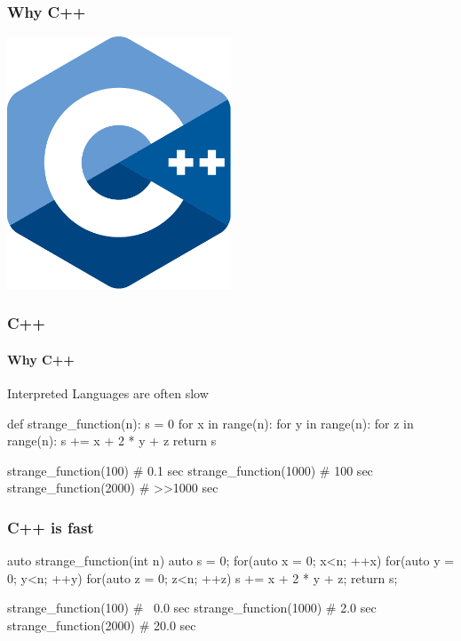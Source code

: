\documentclass{beamer}
\begin{document}
\begin{frame}[fragile]
\frametitle{Why C++}

\begin{center}
    \includegraphics[width=0.5\textwidth]{cpp.pdf}
\end{center}

\end{frame}

\begin{frame}[fragile]
\frametitle{C++}
\framesubtitle{Why C++}
Interpreted Languages are often slow
\begin{pythoncode}
def strange_function(n):
    s = 0
    for x in range(n):
        for y in range(n):
            for z in range(n):
                s += x + 2 * y + z
    return s
\end{pythoncode}
\vspace{-0.5cm}
\begin{pythoncode}
strange_function(100)   #    0.1 sec
strange_function(1000)  #    100 sec
strange_function(2000)  # >>1000 sec
\end{pythoncode}
\end{frame}

\begin{frame}[fragile]
\frametitle{C++ is fast}
\begin{cppcode}

auto strange_function(int n)
{
    auto s = 0;
    for(auto x = 0; x<n; ++x)
    for(auto y = 0; y<n; ++y)
    for(auto z = 0; z<n; ++z)
    {
        s += x + 2 * y + z;
    }
    return s;
}
\end{cppcode}
\begin{pythoncode}
strange_function(100)   # ~0.0 sec
strange_function(1000)  #  2.0 sec
strange_function(2000)  # 20.0 sec
\end{pythoncode}
\end{frame}
\end{document}
